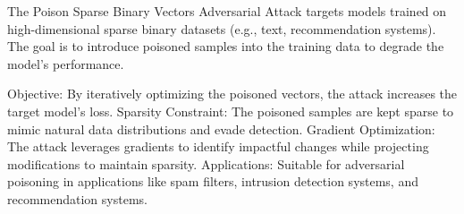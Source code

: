 The Poison Sparse Binary Vectors Adversarial Attack targets models trained on high-dimensional sparse binary datasets (e.g., text, recommendation systems). The goal is to introduce poisoned samples into the training data to degrade the model's performance.

Objective: By iteratively optimizing the poisoned vectors, the attack increases the target model's loss.
Sparsity Constraint: The poisoned samples are kept sparse to mimic natural data distributions and evade detection.
Gradient Optimization: The attack leverages gradients to identify impactful changes while projecting modifications to maintain sparsity.
Applications: Suitable for adversarial poisoning in applications like spam filters, intrusion detection systems, and recommendation systems.